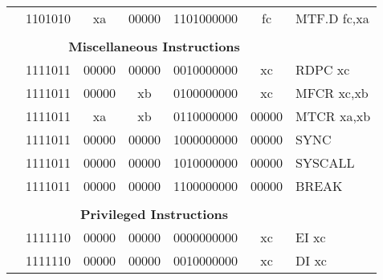 \begin{table}[p]
\begin{small}
\begin{center}
\begin{tabular}{rcccccccccl}
&
\multicolumn{2}{|c|}{1101010} &
\multicolumn{1}{c|}{xa} &
\multicolumn{1}{c|}{00000} &
\multicolumn{4}{c|}{1101000000} &
\multicolumn{1}{c|}{fc} & MTF.D fc,xa \\
\cline{2-10}
  

&
\multicolumn{9}{c}{} & \\
&
\multicolumn{9}{c}{\bf Miscellaneous Instructions} & \\
\cline{2-10}
  

&
\multicolumn{2}{|c|}{1111011} &
\multicolumn{1}{c|}{00000} &
\multicolumn{1}{c|}{00000} &
\multicolumn{4}{c|}{0010000000} &
\multicolumn{1}{c|}{xc} & RDPC xc \\
\cline{2-10}
  

&
\multicolumn{2}{|c|}{1111011} &
\multicolumn{1}{c|}{00000} &
\multicolumn{1}{c|}{xb} &
\multicolumn{4}{c|}{0100000000} &
\multicolumn{1}{c|}{xc} & MFCR xc,xb \\
\cline{2-10}
  

&
\multicolumn{2}{|c|}{1111011} &
\multicolumn{1}{c|}{xa} &
\multicolumn{1}{c|}{xb} &
\multicolumn{4}{c|}{0110000000} &
\multicolumn{1}{c|}{00000} & MTCR xa,xb \\
\cline{2-10}
  

&
\multicolumn{2}{|c|}{1111011} &
\multicolumn{1}{c|}{00000} &
\multicolumn{1}{c|}{00000} &
\multicolumn{4}{c|}{1000000000} &
\multicolumn{1}{c|}{00000} & SYNC  \\
\cline{2-10}
  

&
\multicolumn{2}{|c|}{1111011} &
\multicolumn{1}{c|}{00000} &
\multicolumn{1}{c|}{00000} &
\multicolumn{4}{c|}{1010000000} &
\multicolumn{1}{c|}{00000} & SYSCALL  \\
\cline{2-10}
  

&
\multicolumn{2}{|c|}{1111011} &
\multicolumn{1}{c|}{00000} &
\multicolumn{1}{c|}{00000} &
\multicolumn{4}{c|}{1100000000} &
\multicolumn{1}{c|}{00000} & BREAK  \\
\cline{2-10}
  

&
\multicolumn{9}{c}{} & \\
&
\multicolumn{9}{c}{\bf Privileged Instructions} & \\
\cline{2-10}
  

&
\multicolumn{2}{|c|}{1111110} &
\multicolumn{1}{c|}{00000} &
\multicolumn{1}{c|}{00000} &
\multicolumn{4}{c|}{0000000000} &
\multicolumn{1}{c|}{xc} & EI xc \\
\cline{2-10}
  

&
\multicolumn{2}{|c|}{1111110} &
\multicolumn{1}{c|}{00000} &
\multicolumn{1}{c|}{00000} &
\multicolumn{4}{c|}{0010000000} &
\multicolumn{1}{c|}{xc} & DI xc \\
\cline{2-10}
  


\end{tabular}
\end{center}
\end{small}
\end{table}
